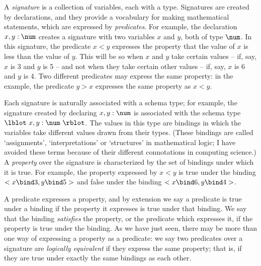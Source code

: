 \new A {\em signature\/}%
is a collection of variables, each with a type. Signatures are created by
declarations, and they provide a vocabulary for making mathematical
statements, which are expressed by {\em predicates}.%
For example, the declaration $x, y: \num$ creates a signature with two
variables $x$ and $y$, both of type $\num$. In this signature, the
predicate $x \lt y$ expresses the property that the value of $x$ is
less than the value of $y$.  This will be so when $x$ and $y$ take
certain values -- if, say, $x$ is 3 and $y$ is 5 -- and not when they
take certain other values -- if, say, $x$ is 6 and $y$ is 4. Two
different predicates may express the same property: in the example, the
predicate $y \gt x$ expresses the same property as $x \lt y$.

\new Each signature is naturally associated with a schema type; for
example, the signature created by declaring $x, y: \num$ is
associated with the schema type $\lblot~x, y: \num~\rblot$.  The
values in this type are bindings in which the variables take
different values drawn from their types.  (These bindings are called
`assignments', `interpretations' or `structures' in mathematical
logic; I have avoided these terms because of their different
connotations in computing science.)  A {\em property\/}%
over the signature is characterized by the set of bindings under which
it is true.  For example, the property expressed by $x \lt y$ is
true under the binding $<x \bind 3, y \bind 5>$ and false under the
binding $<x \bind 6, y \bind 4>$.

A predicate expresses a property, and by extension we say a
predicate is true under a binding if the property it expresses is true
under that binding. We say that the binding {\em satisfies\/}%
%
the property, or the predicate
which expresses it, if the property is true under the binding.  As we
have just seen, there may be more than one way of expressing a
property as a predicate: we say two predicates over a signature are
{\em logically equivalent\/}%
if they express the same property; that is, if they are true under
exactly the same bindings as each other.

